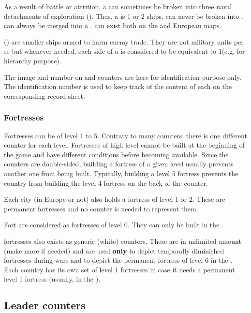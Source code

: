  As a result of battle or attrition, a \ND can
sometimes be broken into three naval detachments of exploration (\NDE).
\bparag Thus, a \NDE is 1 or 2 ships.
\bparag \NGD can never be broken into \NDE.
\NDE can always be merged into a \ND.
\bparag \NDE can exist both on the \ROTW and European maps.

\aparag[Privateers] (\corsaire) are smaller ships armed to harm enemy trade.
\bparag They are not military units per se but whenever needed, each side of a
\corsaire is considered to be equivalent to 1\ND (e.g. for hierarchy purpose).

\aparag The image and number on \FLEET and \ND counters are here for
identification purpose only.
\bparag The identification number is used to keep track of the content of each
\FLEET on the corresponding record sheet.


\subsubsection{Fortresses}
\aparag[Levels] Fortresses can be of level 1 to 5.
\bparag Contrary to many counters, there is one different counter for each
level.
\bparag Fortresses of high level cannot be built at the beginning of the game
and have different conditions before becoming available.
\bparag Since the counters are double-sided, building a fortress of a given
level usually prevents another one from being built. Typically, building a
level 5 fortress prevents the country from building the level 4 fortress on
the back of the counter.

 Each city (in Europe or not) also holds a fortress
of level 1 or 2. These are permanent fortresses and no counter is needed to
represent them.

\aparag[Forts] Fort are considered as fortresses of level 0. They can only be
built in the \ROTW.

\aparag[Level 1] fortresses also exists as generic (white) counters. These are
in unlimited amount (make more if needed) and are used \textbf{only} to depict
temporally diminished fortresses during wars and to depict the permanent
fortress of level 6 \COL in the \ROTW.
\bparag Each country has its own set of level 1 fortresses in case it needs a
permanent level 1 fortress (usually, in the \ROTW).



\subsection{Leader counters}


